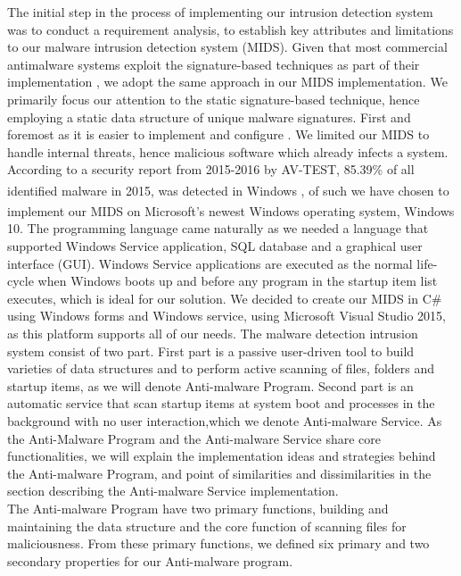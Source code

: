 \documentclass[12pt]{article} %
\begin{document}
The initial step in the process of implementing our intrusion detection system was to conduct a requirement analysis, to establish key attributes and limitations to our malware intrusion detection system (MIDS). Given that most commercial antimalware systems exploit the signature-based techniques as part of their implementation \cite{kruegel2003using}, we adopt the same approach in our MIDS implementation. We primarily focus our attention to the static signature-based technique, hence employing a static data structure of unique malware signatures.   First and foremost as it is easier to implement and configure \cite{kruegel2003using}. We limited our MIDS to handle internal threats, hence malicious software which already infects a system.\\ 
According to a security report from 2015-2016 by AV-TEST, 85.39\% of all identified malware in 2015, was detected in Windows\textsuperscript{\textregistered} \cite{avtestreport}, of such we have chosen to implement our MIDS on Microsoft’s newest Windows\textsuperscript{\textregistered} operating system, Windows\textsuperscript{\textregistered} 10. The programming language came naturally as we needed a language that supported Windows Service application, SQL database and a graphical user interface (GUI). Windows Service applications are executed as the normal life-cycle when Windows boots up and before any program in the startup item list executes, which is ideal for our solution. We decided to create our MIDS in C\# using Windows forms and Windows service, using Microsoft Visual Studio 2015, as this platform supports all of our needs.
The malware detection intrusion system consist of two part. First part is a passive user-driven tool to build varieties of data structures and to perform active scanning of files, folders and startup items, as we will denote Anti-malware Program. Second part is an automatic service that scan startup items at system boot and processes in the background with no user interaction,which we denote Anti-malware Service. As the Anti-Malware Program and the Anti-malware Service share core functionalities, we will explain the implementation ideas and strategies behind the Anti-malware Program, and point of similarities and dissimilarities in the section describing the Anti-malware Service implementation.\\ 
The Anti-malware Program have two primary functions, building and maintaining the data structure and the core function of scanning files for maliciousness. From these primary functions, we defined six primary and two secondary properties for our Anti-malware program. 
\end{document}
